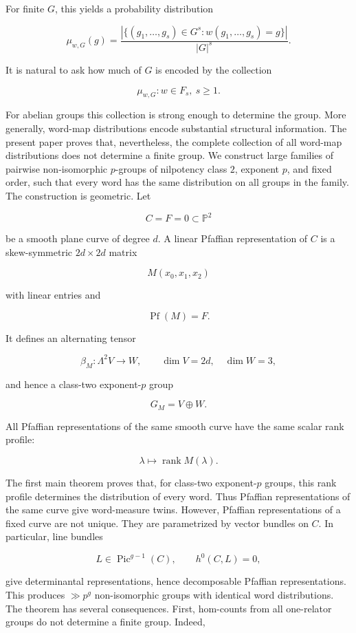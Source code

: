 \documentclass[11pt]{article}
\begin{document}
For finite $G$, this yields a probability distribution

\[
\mu_{w,G}(g)
=\frac{
|\{(g_1,\ldots,g_s)\in G^s:w(g_1,\ldots,g_s)=g\}|
}{
|G|^s
}.
\]

It is natural to ask how much of $G$ is encoded by the collection

\[
{\mu_{w,G}: w\in F_s,\ s\ge1}.
\]

For abelian groups this collection is strong enough to determine the group. More generally, word-map distributions encode substantial structural information. The present paper proves that, nevertheless, the complete collection of all word-map distributions does not determine a finite group. We construct large families of pairwise non-isomorphic $p$-groups of nilpotency class $2$, exponent $p$, and fixed order, such that every word has the same distribution on all groups in the family. The construction is geometric. Let

\[
C={F=0}\subset\mathbb P^2
\]

be a smooth plane curve of degree $d$. A linear Pfaffian representation of $C$ is a skew-symmetric $2d\times2d$ matrix

\[
M(x_0,x_1,x_2)
\]

with linear entries and

\[
\operatorname{Pf}(M)=F.
\]

It defines an alternating tensor

\[
\beta_M:\Lambda^2V\to W,
\qquad
\dim V=2d,\quad
\dim W=3,
\]

and hence a class-two exponent-$p$ group

\[
G_M=V\oplus W.
\]

All Pfaffian representations of the same smooth curve have the same scalar rank profile:

\[
\lambda\longmapsto \operatorname{rank}M(\lambda).
\]

The first main theorem proves that, for class-two exponent-$p$ groups, this rank profile determines the distribution of every word. Thus Pfaffian representations of the same curve give word-measure twins. However, Pfaffian representations of a fixed curve are not unique. They are parametrized by vector bundles on $C$. In particular, line bundles

\[
L\in\operatorname{Pic}^{g-1}(C),
\qquad h^0(C,L)=0,
\]

give determinantal representations, hence decomposable Pfaffian representations. This produces $\gg p^g$ non-isomorphic groups with identical word distributions. The theorem has several consequences. First, hom-counts from all one-relator groups do not determine a finite group. Indeed,
\end{document}
